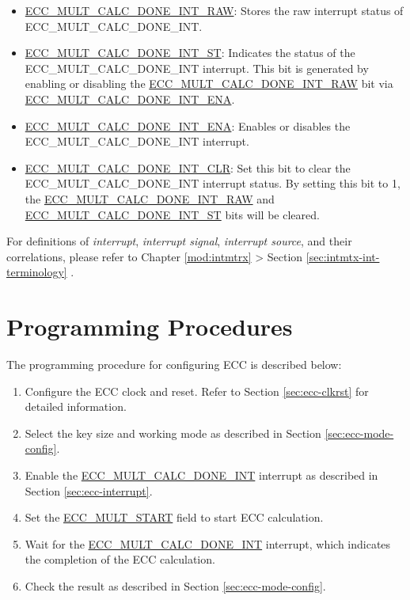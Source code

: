 \documentclass[main\_\_EN.tex]{subfiles}
\begin{document}
\begin{itemize}
    \item \hyperref[fielddesc:ECCMULTCALCDONEINTRAW]{ECC\_MULT\_CALC\_DONE\_INT\_RAW}: Stores the raw interrupt status of ECC\_MULT\_CALC\_DONE\_INT.
    \item \hyperref[fielddesc:ECCMULTCALCDONEINTST]{ECC\_MULT\_CALC\_DONE\_INT\_ST}: Indicates the status of the ECC\_MULT\_CALC\_DONE\_INT interrupt. This bit is generated by enabling or disabling the \hyperref[fielddesc:ECCMULTCALCDONEINTRAW]{ECC\_MULT\_CALC\_DONE\_INT\_RAW} bit via \hyperref[fielddesc:ECCMULTCALCDONEINTENA]{ECC\_MULT\_CALC\_DONE\_INT\_ENA}.
    \item \hyperref[fielddesc:ECCMULTCALCDONEINTENA]{ECC\_MULT\_CALC\_DONE\_INT\_ENA}: Enables or disables the ECC\_MULT\_CALC\_DONE\_INT interrupt.
    \item \hyperref[fielddesc:ECCMULTCALCDONEINTCLR]{ECC\_MULT\_CALC\_DONE\_INT\_CLR}: Set this bit to clear the ECC\_MULT\_CALC\_DONE\_INT interrupt status. By setting this bit to 1, the \hyperref[fielddesc:ECCMULTCALCDONEINTRAW]{ECC\_MULT\_CALC\_DONE\_INT\_RAW} and  \hyperref[fielddesc:ECCMULTCALCDONEINTST]{ECC\_MULT\_CALC\_DONE\_INT\_ST} bits will be cleared.
\end{itemize}

\begin{tiplisting}
For definitions of \textit{interrupt}, \textit{interrupt signal}, \textit{interrupt source}, and their correlations, please refer to Chapter \ref{mod:intmtrx} \textit{} > Section \ref{sec:intmtx-int-terminology} \textit{}.
\end{tiplisting}


\section{Programming Procedures}

The programming procedure for configuring ECC is described below:

\begin{enumerate}
    \item Configure the ECC clock and reset. Refer to Section \ref{sec:ecc-clkrst} for detailed information.
    \item Select the key size and working mode as described in Section \ref{sec:ecc-mode-config}.
    \item Enable the \hyperref[int:ECCMULTCALCDONEINT]{ECC\_MULT\_CALC\_DONE\_INT} interrupt as described in Section \ref{sec:ecc-interrupt}.
    \item Set the \hyperref[fielddesc:ECCMULTSTART]{ECC\_MULT\_START} field to start ECC calculation.
    \item Wait for the \hyperref[int:ECCMULTCALCDONEINT]{ECC\_MULT\_CALC\_DONE\_INT} interrupt, which indicates the completion of the ECC calculation.
    \item Check the result as described in Section \ref{sec:ecc-mode-config}.
\end{enumerate}
\end{document}
